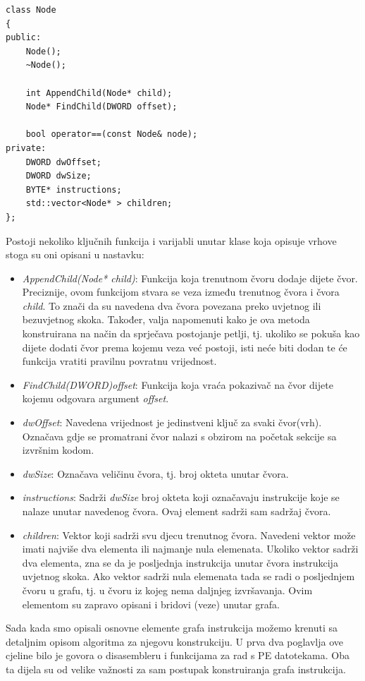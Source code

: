 \documentclass[times, utf8, diplomski, numeric]{fer}
\begin{document}
\begin{lstlisting}[frame=single, caption=Klasa koja opisuje vrh(čvor) grafa instrukcija, label={lst:node}]
class Node
{
public:
	Node();
	~Node();

	int AppendChild(Node* child);
	Node* FindChild(DWORD offset);

	bool operator==(const Node& node);
private:
	DWORD dwOffset;
	DWORD dwSize;
	BYTE* instructions;
	std::vector<Node* > children;
};
\end{lstlisting}
Postoji nekoliko ključnih funkcija i varijabli unutar klase koja opisuje vrhove stoga su oni opisani u nastavku:
\begin{itemize}
\item \emph{AppendChild(Node* child)}: Funkcija koja trenutnom čvoru dodaje dijete čvor. Preciznije, ovom funkcijom stvara se veza između trenutnog čvora i čvora \emph{child}. To znači da su navedena dva čvora povezana preko uvjetnog ili bezuvjetnog skoka. Također, valja napomenuti kako je ova metoda konstruirana na način da sprječava postojanje petlji, tj. ukoliko se pokuša kao dijete dodati čvor prema kojemu veza već postoji, isti neće biti dodan te će funkcija vratiti pravilnu povratnu vrijednost.
\item \emph{FindChild(DWORD)offset}: Funkcija koja vraća pokazivač na čvor dijete kojemu odgovara argument \emph{offset}.
\item \emph{dwOffset}: Navedena vrijednost je jedinstveni ključ za svaki čvor(vrh). Označava gdje se promatrani čvor nalazi s obzirom na početak sekcije sa izvršnim kodom.
\item \emph{dwSize}: Označava veličinu čvora, tj. broj okteta unutar čvora.
\item \emph{instructions}: Sadrži \emph{dwSize} broj okteta koji označavaju instrukcije koje se nalaze unutar navedenog čvora. Ovaj element sadrži sam sadržaj čvora.
\item \emph{children}: Vektor koji sadrži svu djecu trenutnog čvora. Navedeni vektor može imati najviše dva elementa ili najmanje nula elemenata. Ukoliko vektor sadrži dva elementa, zna se da je posljednja instrukcija unutar čvora instrukcija uvjetnog skoka. Ako vektor sadrži nula elemenata tada se radi o posljednjem čvoru u grafu, tj. u čvoru iz kojeg nema daljnjeg izvršavanja. Ovim elementom su zapravo opisani i bridovi (veze) unutar grafa.
\end{itemize}
Sada kada smo opisali osnovne elemente grafa instrukcija možemo krenuti sa detaljnim opisom algoritma za njegovu konstrukciju. U prva dva poglavlja ove cjeline bilo je govora o disasembleru i funkcijama za rad s PE datotekama. Oba ta dijela su od velike važnosti za sam postupak konstruiranja grafa instrukcija.
\end{document}
